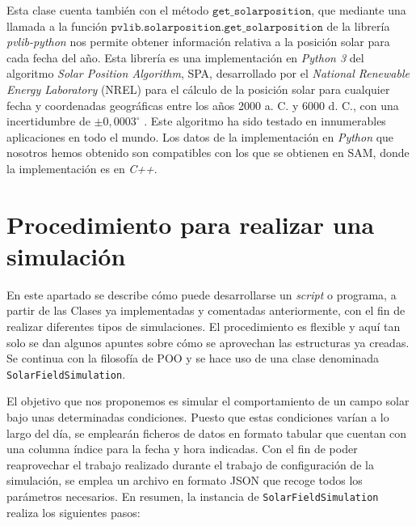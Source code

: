 Esta clase cuenta también con el  método $\texttt{get\_solarposition}$, que mediante una llamada a la función $\texttt{pvlib.solarposition.get\_solarposition}$ de la librería \emph{pvlib-python} nos permite obtener información relativa a la posición solar para cada fecha del año. Esta librería es una implementación en \emph{Python 3} del algoritmo  \emph{Solar Position Algorithm}, SPA,  desarrollado por el \emph{National Renewable Energy Laboratory} (NREL) para el cálculo de la posición solar para cualquier fecha y coordenadas geográficas entre los años 2000 a. C. y 6000 d. C., con una incertidumbre de $\pm 0,0003^\circ$ \cite{redaSolarPositionAlgorithm2008}. Este algoritmo ha sido testado en innumerables aplicaciones en todo el mundo. Los datos de la implementación en \emph{Python} que nosotros hemos obtenido son compatibles con los que se obtienen en SAM,  donde la implementación es en \emph{C++}.


\section{Procedimiento para realizar una simulación}

En este apartado se describe cómo puede desarrollarse un \emph{script} o programa, a partir de las Clases ya implementadas y comentadas anteriormente, con el fin de realizar diferentes tipos de simulaciones. El procedimiento es flexible y aquí tan solo se dan algunos apuntes sobre cómo se aprovechan las estructuras ya creadas. Se continua con la filosofía de POO y se hace uso de una clase denominada \texttt{SolarFieldSimulation}.

El objetivo que nos proponemos es simular el comportamiento de un campo solar bajo unas determinadas condiciones. Puesto que estas condiciones varían a lo largo del día, se emplearán ficheros de datos en formato tabular que cuentan con una columna índice para la fecha y hora indicadas. Con el fin de poder reaprovechar el trabajo realizado durante el trabajo de configuración de la simulación, se emplea un archivo en formato JSON que recoge todos los parámetros necesarios. En resumen, la instancia de \texttt{SolarFieldSimulation} realiza los siguientes pasos:

